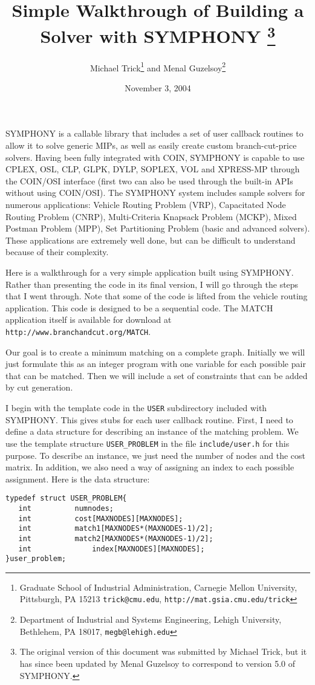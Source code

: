 \documentclass[11pt]{article}
\begin{document}
\title{Simple Walkthrough of Building a Solver with SYMPHONY \thanks{The
original version of this document was submitted by Michael Trick, but it has
since been updated by Menal Guzelsoy to correspond to version 5.0 of
SYMPHONY.}}

\author{Michael Trick\thanks{Graduate School of Industrial Administration,
Carnegie Mellon University, Pittsburgh, PA 15213 \texttt{trick@cmu.edu},
\texttt{http://mat.gsia.cmu.edu/trick}} and Menal Guzelsoy\thanks{Department
of Industrial and Systems Engineering, Lehigh University, Bethlehem, PA 18017,
{\tt megb@lehigh.edu}}}

\date{November 3, 2004}
\maketitle
\thispagestyle{empty}

SYMPHONY is a callable library that includes a set of user callback routines
to allow it to solve generic MIPs, as well as easily create custom
branch-cut-price solvers. Having been fully integrated with COIN, SYMPHONY is
capable to use CPLEX, OSL, CLP, GLPK, DYLP, SOPLEX, VOL and XPRESS-MP through
the COIN/OSI interface (first two can also be used through the built-in APIs
without using COIN/OSI). The SYMPHONY system includes sample solvers for
numerous applications: Vehicle Routing Problem (VRP), Capacitated Node Routing
Problem (CNRP), Multi-Criteria Knapsack Problem (MCKP), Mixed Postman Problem
(MPP), Set Partitioning Problem (basic and advanced solvers).  These
applications are extremely well done, but can be difficult to
understand because of their complexity.

Here is a walkthrough for a very simple application built using
SYMPHONY. Rather than presenting the code in its final version, I will go
through the steps that I went through. Note that some of the code is lifted
from the vehicle routing application. This code is designed to be a sequential
code. The MATCH application itself is available for download at
\texttt{http://www.branchandcut.org/MATCH}.

Our goal is to create a minimum matching on a complete graph.  Initially we
will just formulate this as an integer program with one variable for each
possible pair that can be matched. Then we will include a set of constraints
that can be added by cut generation.

I begin with the template code in the \texttt{USER} subdirectory included with
SYMPHONY. This gives stubs for each user callback routine. First, I need to
define a data structure for describing an instance of the matching problem. We
use the template structure \texttt{USER\_PROBLEM} in the file
\texttt{include/user.h} for this purpose.  To describe an instance, we just
need the number of nodes and the cost matrix. In addition, we also need a way
of assigning an index to each possible assignment. Here is the data
structure: 
\newpage
\begin{verbatim}
typedef struct USER_PROBLEM{
   int		    numnodes;
   int		    cost[MAXNODES][MAXNODES];
   int		    match1[MAXNODES*(MAXNODES-1)/2];
   int		    match2[MAXNODES*(MAXNODES-1)/2]; 
   int              index[MAXNODES][MAXNODES];
}user_problem;
\end{verbatim}
\end{document}
